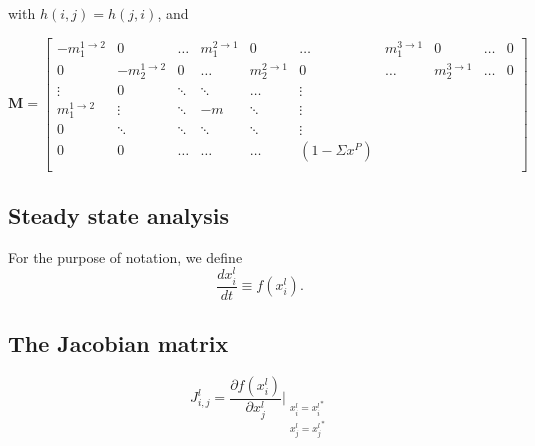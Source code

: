 \documentclass[12pt]{article}
\begin{document}
with $h(i,j) = h(j,i)$, and 

\[ \mathbf{M} = \begin{bmatrix}
    -m_1^{1\rightarrow 2} & 0        & \dots & m_1^{2\rightarrow 1} & 0 & \dots & m_1^{3\rightarrow 1} & 0 & \dots & 0  \\
           0 & -m_2^{1\rightarrow 2} & 0 & \dots & m_2^{2\rightarrow 1} & 0 &  \dots & m_2^{3\rightarrow 1} & \dots & 0 \\
   \vdots & 0& \ddots & \ddots & \dots & \vdots \\
   m_1^{1\rightarrow 2} & \vdots & \ddots &  -m^{} & \ddots & \vdots  \\
   0 & \ddots & \ddots & \ddots & \ddots   & \vdots \\
           0 &         0 &  \dots  & \dots  & \dots & (1-\Sigma x^P) \\ \end{bmatrix} \]

\subsection*{Steady state analysis}
For the purpose of notation, we define
\[ \frac{dx_{i}^{l}}{dt} \equiv f(x_{i}^{l}). \]

\subsection*{The Jacobian matrix}
\[ J_{i,j}^l = \frac{\partial f(x_i^l)}{\partial x_j^l}\Bigr|_{\substack{{x_i^l=x_i^l}^*\\{x_j^l=x_j^l}^*}}  \]
\end{document}
